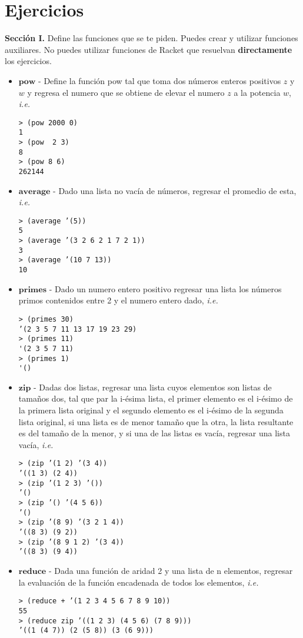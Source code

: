 \documentclass{article}
\begin{document}
\section{Ejercicios}
\textbf{Sección I.} Define las funciones que se te piden. Puedes crear y utilizar
funciones auxiliares. No puedes utilizar funciones de Racket que
resuelvan \textbf{directamente} los ejercicios.
\begin{itemize}

\item $\textbf{pow}$ - Define la función pow tal que toma dos números enteros
  positivos  $z$ y $w$ y regresa el numero que se obtiene de elevar el numero $z$ a la potencia $w$, \textit{i.e.}
\begin{verbatim}
> (pow 2000 0)
1
> (pow  2 3)
8
> (pow 8 6)
262144
\end{verbatim}
\newpage

\item $\textbf{average}$ - Dado una lista no vacía de números, regresar el
  promedio de esta, \textit{i.e.}
\begin{verbatim}
> (average ’(5))
5
> (average ’(3 2 6 2 1 7 2 1))
3
> (average ’(10 7 13))
10
\end{verbatim}

\item $\textbf{primes}$ - Dado un numero entero positivo regresar una lista los
números primos contenidos entre 2 y el numero entero dado, \textit{i.e.}
\begin{verbatim}
> (primes 30)
’(2 3 5 7 11 13 17 19 23 29)
> (primes 11)
'(2 3 5 7 11)
> (primes 1)
'()
\end{verbatim}

\item $\textbf{zip}$ - Dadas dos listas, regresar una lista cuyos elementos son
  listas de tamaños dos, tal que par la i-ésima lista, el primer
  elemento es el i-ésimo de la primera lista original y el segundo
  elemento es el i-ésimo de la segunda lista original, si una lista es
de menor tamaño que la otra, la lista resultante es del tamaño de la
menor, y si una de las listas es vacía, regresar una lista vacía,
\textit{i.e.}
\begin{verbatim}
> (zip ’(1 2) ’(3 4))
’((1 3) (2 4))
> (zip ’(1 2 3) ’())
’()
> (zip ’() ’(4 5 6))
’()
> (zip ’(8 9) ’(3 2 1 4))
’((8 3) (9 2))
> (zip ’(8 9 1 2) ’(3 4))
’((8 3) (9 4))
\end{verbatim}

\item $\textbf{reduce}$ - Dada una función de aridad 2 y una lista de
  n elementos, regresar la evaluación de la función encadenada de
  todos los elementos, \textit{i.e.}
\begin{verbatim}
> (reduce + ’(1 2 3 4 5 6 7 8 9 10))
55
> (reduce zip ’((1 2 3) (4 5 6) (7 8 9)))
’((1 (4 7)) (2 (5 8)) (3 (6 9)))
\end{verbatim}

\end{itemize}
\end{document}
